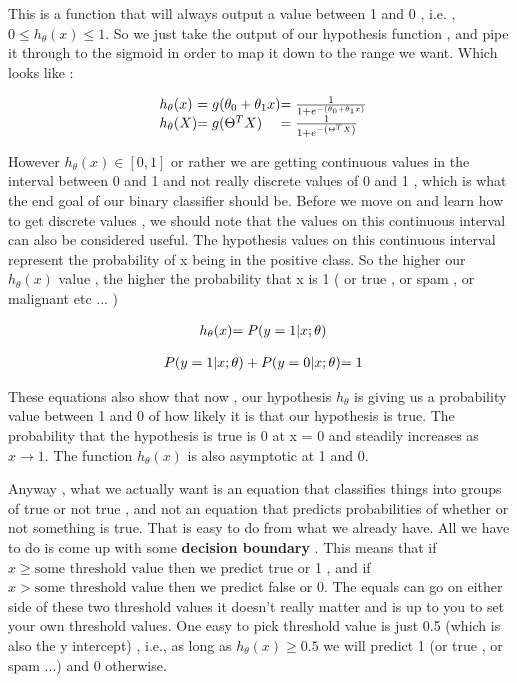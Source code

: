 
This is a function that will always output a value between 1 and 0 , i.e. , $ 0
\leq h_{\theta} (x) \leq 1 $. So we just take the output of our hypothesis
function , and pipe it through to the sigmoid in order to map it down to the
range we want. Which looks like :

\[
\begin{array}{ l@{} l@{} l@{} }
	h_\theta(x)
	& = g(\theta_0 + \theta_1 x) 
	& =
	\frac{1}
	{
		1+e^
		{
			-
			\left(
				\theta_0 + \theta_1 x
			\right)
		}
	}
	\\
	h_\theta(X)
	& = g(\Theta^T X)
	& =
	\frac{1}
	{
		1+e^
		{
			-
			\left(
				\Theta^T X
			\right)
		}
	}
	\\
\end{array}
\]

However $h_\theta(x) \in [0,1]$ or rather we are getting continuous values in
the interval between 0 and 1 and not really discrete values of 0 and 1 , which
is what the end goal of our binary classifier should be. Before we move on and
learn how to get discrete values , we should note that the values on this
continuous interval can also be considered useful. The hypothesis values on
this continuous interval represent the probability of x being in the positive
class. So the higher our $ h_\theta (x)$ value , the higher the probability
that x is 1 ( or true , or spam , or malignant etc ... )

\[
	\begin{array}{ l@{} l@{} }

	h_\theta(x) & = P(y=1|x;\theta)\\

	\end{array}
\]

\[
	\begin{array}{ l@{} l@{} }

	P(y=1|x;\theta) + P(y=0|x;\theta) & = 1 \\

	\end{array}
\]

These equations also show that now , our hypothesis $h_\theta$ is giving us a
probability value between 1 and 0 of how likely it is that our hypothesis is
true. The probability that the hypothesis is true is 0 at x = 0
and steadily increases as $x \rightarrow 1$. The function $h_\theta (x)$ is also
asymptotic at 1 and 0.

Anyway , what we actually want is an equation that classifies things into
groups of true or not true , and not an equation that predicts probabilities of
whether or not something is true. That is easy to do from what we already have.
All we have to do is come up with some \textbf{decision boundary} . This means
that if $x \geq \text{some threshold value}$ then we predict true or 1 , and if
$x > \text{some threshold value}$ then we predict false or 0. The equals can go
on either side of these two threshold values it doesn't really matter and is up
to you to set your own threshold values. One easy to pick threshold value is
just 0.5 (which is also the y intercept) , i.e., as long as $h_\theta (x) \geq
0.5 $ we will predict 1 (or true , or spam ...) and 0 otherwise.

